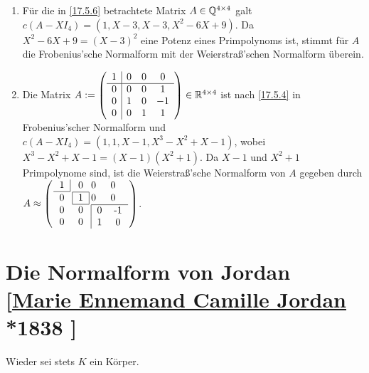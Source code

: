 \documentclass[../../main.tex]{subfiles}
\begin{document}
\begin{bsp}\label{17.6.3}
\begin{enumerate}[\normalfont(a)]
\item Für die in \ref{17.5.6} betrachtete Matrix $A\in \mathbb Q^{4\times 4}$ galt $c(A-XI_4)=(1,X-3,X-3,X^2-6X+9)$. Da $X^2-6X+9=(X-3)^2$ eine Potenz eines Primpolynoms ist, stimmt für $A$ die Frobenius'sche Normalform mit der Weierstraß'schen Normalform überein.
\item Die Matrix $A:=\left(\begin{array}{c|ccc}1&0&0&0\\\hline 0&0&0&1\\0&1&0&-1\\0&0&1&1\end{array}\right)\in \mathbb R^{4\times 4}$ ist nach \ref{17.5.4} in Frobenius'scher Normalform und $c(A-XI_4)=(1, 1, X-1, X^3-X^2+X-1)$, wobei $X^3-X^2+X-1=(X-1)(X^2+1)$. Da $X-1$ und $X^2+1$ Primpolynome sind, ist die Weierstraß'sche Normalform von $A$ gegeben durch $A\approx\arraycolsep=1pt
\left(\begin{array}{c c c c}
\begin{tabular}{c|}1\\\hline\end{tabular}&0&0&0\\
0&\begin{tabular}{|c|}\hline 1\\\hline\end{tabular}&0&0\\
0&0&\multicolumn{2}{c}{\multirow{2}{*}{\begin{tabular}{|cc}
\hline 0&-1\\1&0\end{tabular}}}\\0&0
\end{array}\right)$.
\end{enumerate}
\end{bsp}

\section[Die Normalform von Jordan]{Die Normalform von Jordan\\{\small[\href{https://en.wikipedia.org/wiki/Camille_Jordan}{Marie Ennemand Camille Jordan} *1838 ]}}

Wieder sei stets $K$ ein Körper.
\end{document}
